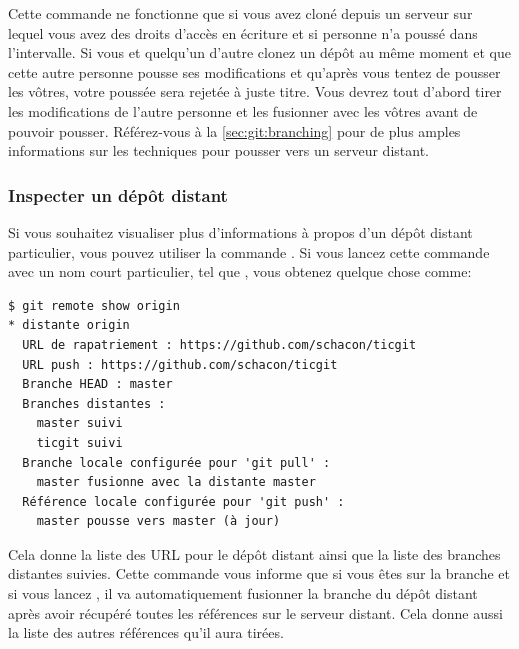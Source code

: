 Cette commande ne fonctionne que si vous avez cloné depuis un serveur sur lequel vous avez des droits d'accès en écriture et si personne n'a poussé dans l'intervalle.
Si vous et quelqu'un d'autre clonez un dépôt au même moment et que cette autre personne pousse ses modifications et qu'après vous tentez de pousser les vôtres, votre poussée sera rejetée à juste titre.
Vous devrez tout d'abord tirer les modifications de l'autre personne et les fusionner avec les vôtres avant de pouvoir pousser.
Référez-vous à la \autoref{sec:git:branching} pour de plus amples informations sur les techniques pour pousser vers un serveur distant.

\subsubsection{Inspecter un dépôt distant}
\label{sec:git:inspecting_remote}

Si vous souhaitez visualiser plus d'informations à propos d'un dépôt distant particulier, vous pouvez utiliser la commande .
Si vous lancez cette commande avec un nom court particulier, tel que , vous obtenez quelque chose comme:
\begin{Schunk}
\begin{Verbatim}
$ git remote show origin
* distante origin
  URL de rapatriement : https://github.com/schacon/ticgit
  URL push : https://github.com/schacon/ticgit
  Branche HEAD : master
  Branches distantes :
    master suivi
    ticgit suivi
  Branche locale configurée pour 'git pull' :
    master fusionne avec la distante master
  Référence locale configurée pour 'git push' :
    master pousse vers master (à jour)
\end{Verbatim}
\end{Schunk}

Cela donne la liste des URL pour le dépôt distant ainsi que la liste des branches distantes suivies.
Cette commande vous informe que si vous êtes sur la branche  et si vous lancez , il va automatiquement fusionner la branche  du dépôt distant après avoir récupéré toutes les références sur le serveur distant.
Cela donne aussi la liste des autres références qu'il aura tirées.

